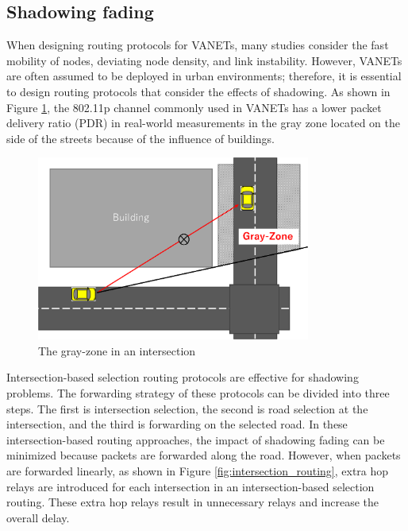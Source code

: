 \documentclass[conference]{IEEEtran}
\begin{document}
\subsection{Shadowing fading}
When designing routing protocols for VANETs, many studies consider the fast mobility of nodes, deviating node density, and link instability. 
However, VANETs are often assumed to be deployed in urban environments; therefore, it is essential to design routing protocols that consider the effects of shadowing.  
As shown in Figure \ref{fig:Gray-Zone}, the 802.11p channel commonly used in VANETs has a lower packet delivery ratio (PDR) in real-world measurements in the gray zone \cite{17} located on the side of the streets because of the influence of buildings.

\begin{figure}[!ht]
\centering
\includegraphics[width=90mm]{figures/Gray-Zone.eps}
\caption{The gray-zone in an intersection }
\label{fig:Gray-Zone}
\end{figure}



Intersection-based selection routing protocols \cite{24,25,26}  are effective for shadowing problems.
The forwarding strategy of these protocols can be divided into three steps. The first is intersection selection, the second is road selection at the intersection, and the third is forwarding on the selected road. 
In these intersection-based routing approaches, the impact of shadowing fading can be minimized because packets are forwarded along the road.
However, when packets are forwarded linearly, as shown in Figure \ref{fig:intersection_routing}, extra hop relays are introduced for each intersection in an intersection-based selection routing. These extra hop relays result in unnecessary relays and increase the overall delay.
\end{document}
